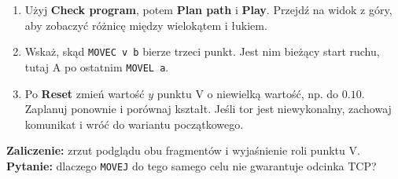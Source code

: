 \documentclass[10pt,a4paper]{article}
\newcommand{\ui}[1]{\textbf{\textsf{#1}}}
\newcommand{\cmd}[1]{\texttt{#1}}
\begin{document}
\begin{enumerate}
\item Użyj \ui{Check program}, potem \ui{Plan path} i \ui{Play}. Przejdź na widok z góry, aby zobaczyć różnicę między wielokątem i łukiem.
\item Wskaż, skąd \cmd{MOVEC v b} bierze trzeci punkt. Jest nim bieżący start ruchu, tutaj A po ostatnim \cmd{MOVEL a}.
\item Po \ui{Reset} zmień wartość \(y\) punktu V o niewielką wartość, np. do \(0.10\). Zaplanuj ponownie i porównaj kształt. Jeśli tor jest niewykonalny, zachowaj komunikat i wróć do wariantu początkowego.
\end{enumerate}
\textbf{Zaliczenie:} zrzut podglądu obu fragmentów i wyjaśnienie roli punktu V. \textbf{Pytanie:} dlaczego \cmd{MOVEJ} do tego samego celu nie gwarantuje odcinka TCP?
\end{document}
